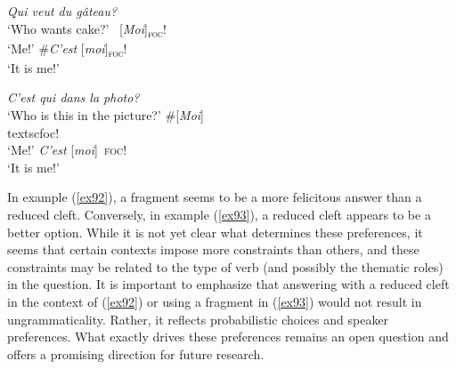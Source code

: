   
\ea \label{ex92}
\ea \textit{Qui veut du gâteau?}\\
 ‘Who wants cake?'
 \ [\textit{Moi}]\textsubscript{\textsc{foc}}\normalsize!\\
‘Me!'
 \#\textit{C'est} [\textit{moi}]\textsubscript{\textsc{foc}}\normalsize!\\
‘It is me!'
\z \z 

\ea \label{ex93}
\ea \textit{C'est qui dans la photo?}\\
 ‘Who is this in the picture?'
 \#[\textit{Moi}]\\textsc{foc}\normalsize!\\
‘Me!'
  \textit{C'est} [\textit{moi}]\ \textsc{foc}\normalsize!\\
‘It is me!'
\z \z

In example (\ref{ex92}), a fragment seems to be a more felicitous answer than a reduced cleft. Conversely, in example (\ref{ex93}), a reduced cleft appears to be a better option. While it is not yet clear what determines these preferences, it seems that certain contexts impose more constraints than others, and these constraints may be related to the type of verb (and possibly the thematic roles) in the question.
It is important to emphasize that answering with a reduced cleft in the context of (\ref{ex92}) or using a fragment in (\ref{ex93}) would not result in ungrammaticality. Rather, it reflects probabilistic choices and speaker preferences. What exactly drives these preferences remains an open question and offers a promising direction for future research.




